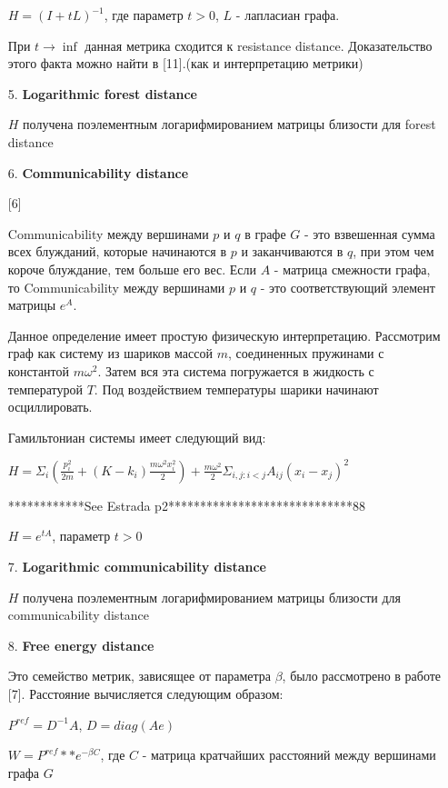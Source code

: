 \begin{itemize}
$H = (I + tL) ^{-1}$, где параметр $t > 0$, $L$ - лапласиан графа.

При $t \to \inf$ данная метрика сходится к resistance distance. Доказательство этого факта можно найти в [11].(как и интерпретацию метрики)

\item[5.] \textbf{Logarithmic forest distance}

$H$ получена поэлементным логарифмированием матрицы близости для forest distance

\item[6.] \textbf{Communicability distance}

[6]

Communicability между вершинами $p$ и $q$ в графе $G$ - это взвешенная сумма всех блужданий, которые начинаются в $p$ и заканчиваются в $q$, при этом чем короче блуждание, тем больше его вес. Если $A$ - матрица смежности графа, то Communicability между вершинами $p$ и $q$ - это соответствующий элемент матрицы $e^{A}$. 

Данное определение имеет простую физическую интерпретацию. Рассмотрим граф как систему из шариков массой $m$, соединенных пружинами с константой $m \omega ^2$. Затем вся эта система погружается в жидкость с температурой $T$. Под воздействием температуры шарики начинают осциллировать.

Гамильтониан системы имеет следующий вид:

$H = \Sigma _i (\frac{p_i^2}{2m} + (K-k_i)\frac{m\omega ^2 x_i^2}{2}) + \frac{m \omega ^2}{2} \Sigma _{i,j : i<j } A_{ij} (x_i-x_j)^2 $

************See Estrada p2*****************************88 

$H = e^{tA}$, параметр $t > 0$

\item[7.] \textbf{Logarithmic communicability distance}

$H$ получена поэлементным логарифмированием матрицы близости для communicability distance

\item[8.] \textbf{Free energy distance}

Это семейство метрик, зависящее от параметра $\beta$, было рассмотрено в работе [7]. Расстояние вычисляется следующим образом:

$P^{ref} = D^{-1} A$, $D = diag(Ae)$

$W = P^{ref} ** e^{-\beta C}$, где $C$ - матрица кратчайших расстояний между вершинами графа $G$


\end{itemize}
